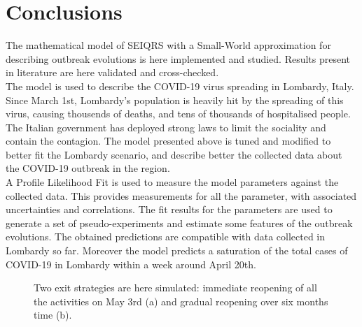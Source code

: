 \section{Conclusions}
\label{sec:conclusions}

The mathematical model of SEIQRS \cite{MingLiu,OldMingLiu} with a Small-World approximation for describing outbreak evolutions is here implemented and studied. Results present in literature are here validated and cross-checked.\\

The model is used to describe the COVID-19 virus spreading in Lombardy, Italy. Since March 1st, Lombardy's population is heavily hit by the spreading of this virus, causing thousends of deaths, and tens of thousands of hospitalised people. The Italian government has deployed strong laws to limit the sociality and contain the contagion. The model presented above is tuned and modified to better fit the Lombardy scenario, and describe better the collected data about the COVID-19 outbreak in the region.\\

A Profile Likelihood Fit is used to measure the model parameters against the collected data. This provides measurements for all the parameter, with associated uncertainties and correlations. The fit results for the parameters are used to generate a set of pseudo-experiments and estimate some features of the outbreak evolutions. The obtained  predictions  are compatible with data collected in Lombardy so far. Moreover the model predicts a saturation of the total cases of COVID-19 in Lombardy within a week around April 20th.\\


\begin{figure}
\centering
{}
  \caption{Two exit strategies are here simulated: immediate reopening of all the activities on May 3rd (a) and gradual reopening over six months time (b).}
  \label{fig:reopening}
\end{figure}

